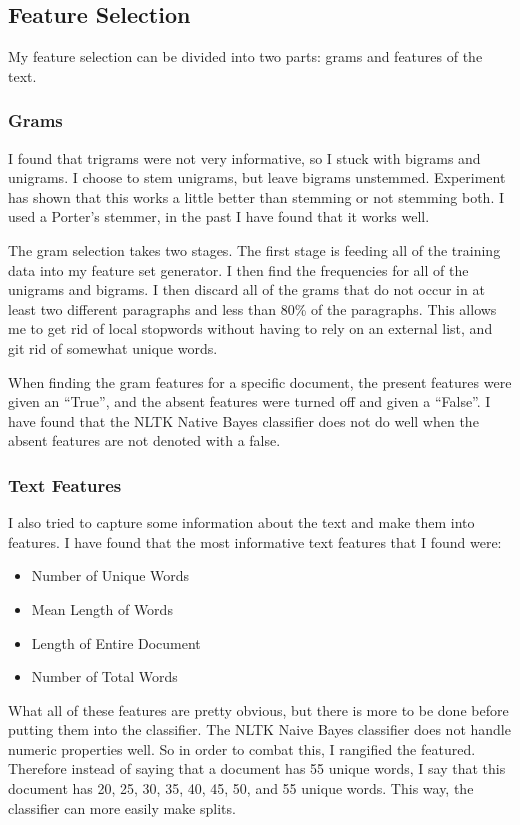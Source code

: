 \documentclass[]{IEEEtran}
\begin{document}
\subsection{Feature Selection}
My feature selection can be divided into two parts: grams and features of the text.

\subsubsection{Grams}
I found that trigrams were not very informative, so I stuck with bigrams and unigrams.
I choose to stem unigrams, but leave bigrams unstemmed. Experiment has shown that this works a little better than
stemming or not stemming both. I used a Porter's stemmer, in the past I have found that it works well.

The gram selection takes two stages. The first stage is feeding all of the training data into my feature set generator.
I then find the frequencies for all of the unigrams and bigrams. I then discard all of the grams that do not occur in
at least two different paragraphs and less than 80\% of the paragraphs. This allows me to get rid of local stopwords
without having to rely on an external list, and git rid of somewhat unique words.

When finding the gram features for a specific document, the present features were given an ``True'', and the absent
features were turned off and given a ``False''. I have found that the NLTK Native Bayes classifier does not do
well when the absent features are not denoted with a false.

\subsubsection{Text Features}
I also tried to capture some information about the text and make them into features.
I have found that the most informative text features that I found were:

\begin{itemize}
   \item Number of Unique Words
   \item Mean Length of Words
   \item Length of Entire Document
   \item Number of Total Words
\end{itemize}

What all of these features are pretty obvious, but there is more to be done before putting them into the classifier.
The NLTK Naive Bayes classifier does not handle numeric properties well. So in order to combat this, I rangified the
featured. Therefore instead of saying that a document has 55 unique words, I say that this document has
20, 25, 30, 35, 40, 45, 50, and 55 unique words. This way, the classifier can more easily make splits.
\end{document}
